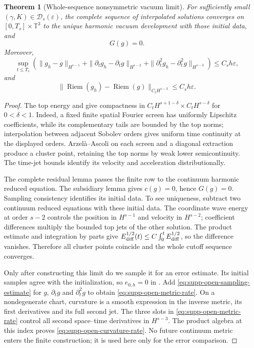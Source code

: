 \documentclass[11pt]{article}
\newtheorem{theorem}{Theorem}[section]
\numberwithin{equation}{section}
\theoremstyle{definition}
\theoremstyle{remark}
\begin{document}
\begin{theorem}[Whole-sequence nonsymmetric vacuum limit]
\label{thm:supp-open-einstein}
For sufficiently small $(\gamma,K)\in\mathcal D_s(\varepsilon)$, the
complete sequence of interpolated solutions converges on
$[0,T_s]\times\mathbb T^3$ to the unique harmonic vacuum development with
those initial data, and
\begin{equation}
 G(g)=0.
 \label{eq:supp-open-vacuum}
\end{equation}
Moreover,
\begin{equation}
 \sup_{t\le T_s}\left(
 \|g_h-g\|_{H^{s-1}}+\|\partial_tg_h-\partial_tg\|_{H^{s-2}}
 +\|\partial_t^2g_h-\partial_t^2g\|_{H^{s-3}}\right)
 \le C_sh\varepsilon,
 \label{eq:supp-open-metric-rate}
\end{equation}
and
\begin{equation}
 \|\operatorname{Riem}(g_h)-\operatorname{Riem}(g)\|_{C_tH^{s-3}}
 \le C_sh\varepsilon.
 \label{eq:supp-open-curvature-rate}
\end{equation}
\end{theorem}
\begin{proof}
The top energy and  give compactness in
$C_tH^{s+1-\delta}\times C_tH^{s-\delta}$ for $0<\delta<1$.
Indeed, a fixed finite spatial Fourier screen has uniformly Lipschitz
coefficients, while its complementary tails are bounded by the top norms;
interpolation between adjacent Sobolev orders gives uniform time
continuity at the displayed orders.  Arzel\`a--Ascoli on each screen and a
diagonal extraction produce a cluster point, retaining the top norms by
weak lower semicontinuity.  The time-jet bounds identify its velocity and
acceleration distributionally.

The complete residual lemma passes the finite row to the continuum
harmonic reduced equation.  The subsidiary lemma gives $c(g)=0$, hence
$G(g)=0$.  Sampling consistency identifies its initial data.  To see
uniqueness, subtract two continuum reduced equations with these initial
data.  The coordinate wave energy at order $s-2$ controls the position in
$H^{s-1}$ and velocity in $H^{s-2}$; coefficient differences multiply the
bounded top jets of the other solution.  The product estimate and
integration by parts give $E_{\rm diff}^{1/2}(t)\le
C\int_0^t E_{\rm diff}^{1/2}$, so the difference vanishes.  Therefore all
cluster points coincide and the whole cutoff sequence converges.

Only after constructing this limit do we sample it for an error estimate.
Its initial samples agree with the initialization, so $e_{0,h}=0$ in
.  Add
\eqref{eq:supp-open-sampling-estimate} for $g$, $\partial_tg$ and
$\partial_t^2g$ to obtain \eqref{eq:supp-open-metric-rate}.
On a nondegenerate chart, curvature is a smooth expression in the inverse
metric, its first derivatives and its full second jet.  The three slots in
\eqref{eq:supp-open-metric-rate} control all second space--time derivatives
in $H^{s-3}$.  The product algebra at this index proves
\eqref{eq:supp-open-curvature-rate}.  No future continuum metric enters the
finite construction; it is used here only for the error comparison.
\end{proof}
\end{document}
